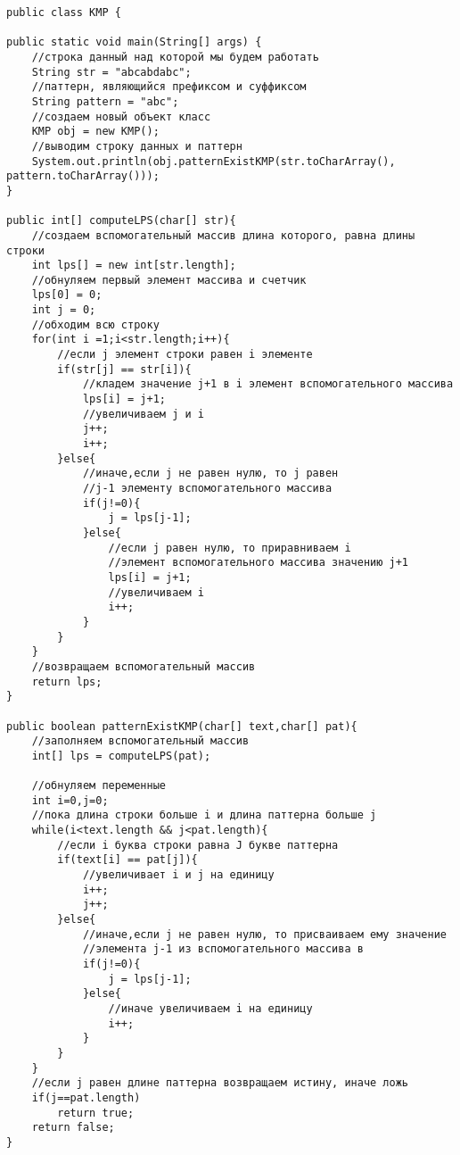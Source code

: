 \begin{tcolorbox}
\begin{verbatim}
public class KMP {

public static void main(String[] args) {
    //строка данный над которой мы будем работать
    String str = "abcabdabc";
    //паттерн, являющийся префиксом и суффиксом
    String pattern = "abc";
    //создаем новый объект класс
    KMP obj = new KMP();
    //выводим строку данных и паттерн
    System.out.println(obj.patternExistKMP(str.toCharArray(),                           pattern.toCharArray()));
}

public int[] computeLPS(char[] str){
    //создаем вспомогательный массив длина которого, равна длины строки
    int lps[] = new int[str.length];
    //обнуляем первый элемент массива и счетчик
    lps[0] = 0;
    int j = 0;
    //обходим всю строку
    for(int i =1;i<str.length;i++){
        //если j элемент строки равен i элементе
        if(str[j] == str[i]){
            //кладем значение j+1 в i элемент вспомогательного массива
            lps[i] = j+1;
            //увеличиваем j и i
            j++;
            i++;
        }else{
            //иначе,если j не равен нулю, то j равен 
            //j-1 элементу вспомогательного массива
            if(j!=0){
                j = lps[j-1];
            }else{
                //если j равен нулю, то приравниваем i 
                //элемент вспомогательного массива значению j+1
                lps[i] = j+1;
                //увеличиваем i
                i++;
            }
        }
    }
    //возвращаем вспомогательный массив 
    return lps;
}

public boolean patternExistKMP(char[] text,char[] pat){
    //заполняем вспомогательный массив
    int[] lps = computeLPS(pat);

    //обнуляем переменные
    int i=0,j=0;
    //пока длина строки больше i и длина паттерна больше j
    while(i<text.length && j<pat.length){
        //если i буква строки равна J букве паттерна
        if(text[i] == pat[j]){
            //увеличивает i и j на единицу
            i++;
            j++;
        }else{
            //иначе,если j не равен нулю, то присваиваем ему значение 
            //элемента j-1 из вспомогательного массива в
            if(j!=0){
                j = lps[j-1];
            }else{
                //иначе увеличиваем i на единицу
                i++;
            }
        }
    }
    //если j равен длине паттерна возвращаем истину, иначе ложь
    if(j==pat.length)
        return true;
    return false;
}

\end{verbatim}
\end{tcolorbox}

